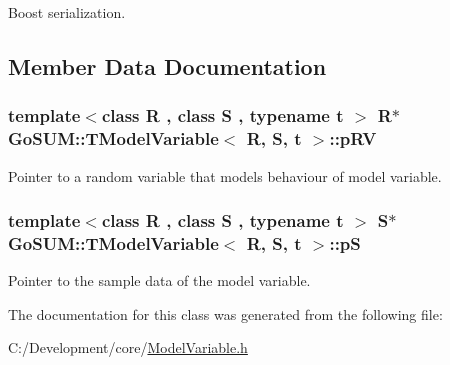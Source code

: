 Boost serialization. 



\subsection{Member Data Documentation}
\hypertarget{class_go_s_u_m_1_1_t_model_variable_ae48bc1204051b96adc0ecff50edea231}{
\subsubsection[{p\-R\-V}]{\setlength{\rightskip}{0pt plus 5cm}template$<$class R , class S , typename t $>$ R$\ast$ {\bf Go\-S\-U\-M\-::\-T\-Model\-Variable}$<$ R, S, t $>$\-::p\-R\-V\hspace{0.3cm}{\ttfamily [protected]}}}\label{class_go_s_u_m_1_1_t_model_variable_ae48bc1204051b96adc0ecff50edea231}


Pointer to a random variable that models behaviour of model variable. 

\hypertarget{class_go_s_u_m_1_1_t_model_variable_a7c0daa5e00c6ea510079dd5bf78916bc}{
\subsubsection[{p\-S}]{\setlength{\rightskip}{0pt plus 5cm}template$<$class R , class S , typename t $>$ S$\ast$ {\bf Go\-S\-U\-M\-::\-T\-Model\-Variable}$<$ R, S, t $>$\-::p\-S\hspace{0.3cm}{\ttfamily [protected]}}}\label{class_go_s_u_m_1_1_t_model_variable_a7c0daa5e00c6ea510079dd5bf78916bc}
Pointer to the sample data of the model variable. 

The documentation for this class was generated from the following file\-:\begin{DoxyCompactItemize}
\item 
C\-:/\-Development/core/\hyperlink{_model_variable_8h}{Model\-Variable.\-h}\end{DoxyCompactItemize}
